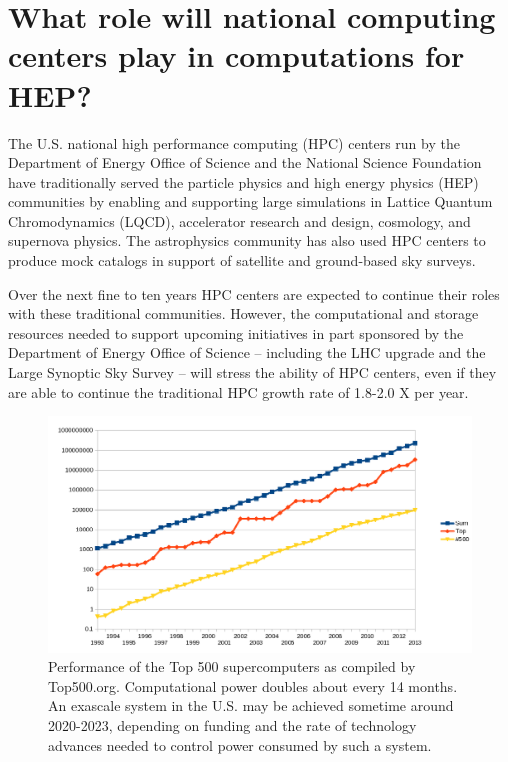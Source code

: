\section{What role will national computing centers play in computations for HEP?}

The U.S. national high performance computing (HPC) centers run by the Department of Energy Office of Science and the National Science Foundation have traditionally served the particle physics and high energy physics (HEP) communities by enabling and supporting large simulations in Lattice Quantum Chromodynamics (LQCD), accelerator research and design, cosmology, and supernova physics. The astrophysics community has also used HPC centers to produce mock catalogs in support of satellite and ground-based sky surveys.
 
Over the next fine to ten years HPC centers are expected to continue their roles with these traditional communities. However, the computational and storage resources needed to support upcoming initiatives in part sponsored by the Department of Energy Office of Science -- including the LHC upgrade and  the Large Synoptic Sky Survey -- will stress the ability of HPC centers, even if they are able to continue the traditional HPC growth rate of 1.8-2.0 X per year.

\begin{figure}[h]
\includegraphics[width=\textwidth]{CpF-I2/images/Top500-plot.png}
\caption{Performance of the Top 500 supercomputers as compiled by Top500.org.  Computational power doubles about every 14 months. An exascale system in the U.S. may be achieved sometime around 2020-2023, depending on funding and the rate of technology advances needed to control power consumed by such a system.}
\label{fig:Top-500}
\end{figure}

